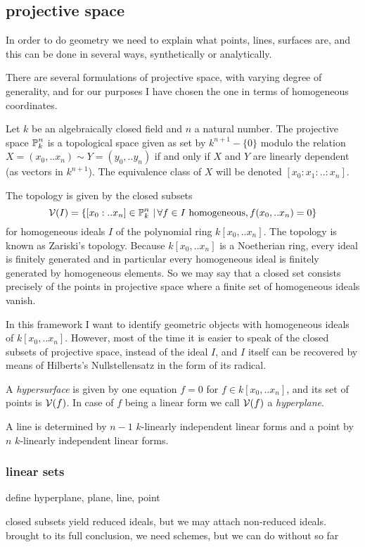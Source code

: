 \subsection{projective space}

In order to do geometry we need to explain what points, lines, surfaces are, and this can be done in several ways, synthetically or analytically.

There are several formulations of projective space, with varying degree of generality, and for our purposes I have chosen the one in terms of homogeneous coordinates.

Let $k$ be an algebraically closed field and $n$ a natural number.
The projective space $\operatorname{\mathbb P}^n_k$ is a topological space given as set by  $k^{n+1} - \{ 0 \}$ modulo the relation $X=(x_0,..x_n) \sim Y=(y_0,..y_n)$ if and only if $X$ and $Y$ are linearly dependent (as vectors in $k^{n+1}$). The equivalence class of $X$ will be denoted $[x_0:x_1:..:x_n]$.

The topology is given by the closed subsets
\begin{equation}
\operatorname{\mathcal V}(I) =
\left\lbrace [x_0:..x_n] \in \operatorname{\mathbb P}^n_k\,|\,  \forall f\in I \text{ homogeneous}, f(x_0,..x_n) = 0\right\rbrace
\end{equation}
for homogeneous ideals $I$ of the polynomial ring $k[x_0,..x_n]$.
The topology is known as Zariski's topology.
Because $k[x_0,..x_n]$ is a Noetherian ring, every ideal is finitely generated and in particular every homogeneous ideal is finitely generated by homogeneous elements.
So we may say that a closed set consists precisely of the points in projective space where a finite set of homogeneous ideals vanish.

In this framework I want to identify geometric objects with homogeneous ideals of $k[x_0,..x_n]$.
However, most of the time it is easier to speak of the closed subsets of projective space, instead of the ideal $I$, and $I$ itself can be recovered by means of Hilberts's Nullstellensatz in the form of its radical.

A \emph{hypersurface} is given by one equation $f=0$ for $f\in k[x_0,..x_n]$, and its set of points is $\operatorname{\mathcal V}(f)$.
In case of $f$ being a linear form we call $\operatorname{\mathcal V}(f)$ a \emph{hyperplane}.

A line is determined by $n-1$ $k$-linearly independent linear forms and a point by $n$ $k$-linearly independent linear forms.



\subsubsection{linear sets}
\begin{todo}
\item define hyperplane, plane, line, point
\item closed subsets yield reduced ideals, but we may attach non-reduced ideals. brought to its full conclusion, we need schemes, but we can do without so far
\end{todo}


